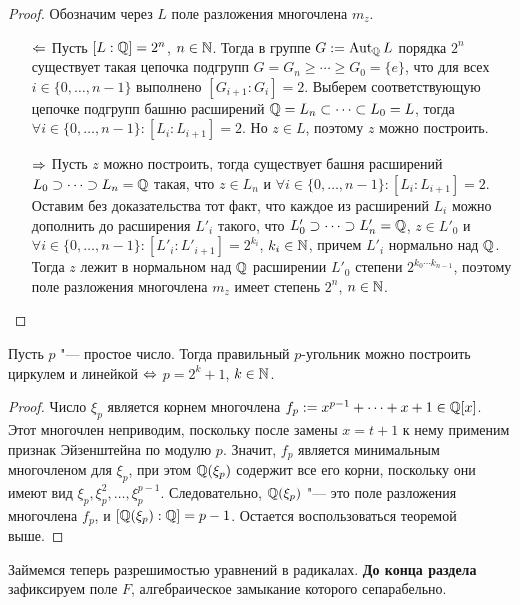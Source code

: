 \begin{proof}
	Обозначим через $L$ поле разложения многочлена $m_{z}$.
	\begin{itemize}
		\item[$\Leftarrow$] Пусть $[L : \mathbb{Q}] = 2^n$, $n \in \mathbb{N}$. Тогда в группе $G := \operatorname{Aut}_{\mathbb{Q}}{L}$ порядка $2^n$ существует такая цепочка подгрупп $G = G_n \ge \dotsb \ge G_0 = \{e\}$, что для всех $i \in \{0, \dotsc, n - 1\}$ выполнено $[G_{i+1} : G_{i}] = 2$. Выберем соответствующую цепочке подгрупп башню расширений $\mathbb{Q} = L_n \subset \dotsb \subset L_0 = L$, тогда $\forall i \in \{0, \dotsc, n-1\}: [L_i : L_{i+1}] = 2$. Но $z \in L$, поэтому $z$ можно построить.
		
		\item[$\Rightarrow$] Пусть $z$ можно построить, тогда существует башня расширений $L_0 \supset \dotsb \supset L_n = \mathbb{Q}$ такая, что $z \in L_n$ и $\forall i \in \{0, \dotsc, n-1\}: [L_{i} : L_{i + 1}] = 2$. Оставим без доказательства тот факт, что каждое из расширений $L_i$ можно дополнить до расширения ${L}'_i$ такого, что $L'_0 \supset \dotsb \supset L'_n = \mathbb{Q}$, $z \in L'_0$ и $\forall i \in \{0, \dotsc, n - 1\}: [L'_i : L'_{i + 1}] = 2^{k_i}$, $k_i \in \mathbb{N}$, причем $L'_i$ нормально над $\mathbb{Q}$. Тогда $z$ лежит в нормальном над $\mathbb{Q}$ расширении $L'_0$ степени $2^{k_0\dotsm k_{n-1}}$, поэтому поле разложения многочлена $m_z$ имеет степень $2^n$, $n \in \mathbb{N}$.\qedhere
	\end{itemize}
\end{proof}

\begin{corollary}
	Пусть $p$ "--- простое число. Тогда правильный $p$-угольник можно построить циркулем и линейкой $\Leftrightarrow$ $p = 2^k + 1$, $k \in \mathbb{N}$.
\end{corollary}

\begin{proof}
	Число $\xi_p$ является корнем многочлена $f_p := x^{p - 1} + \dotsb + x + 1 \in \mathbb{Q}[x]$. Этот многочлен неприводим, поскольку после замены $x = t + 1$ к нему применим признак Эйзенштейна по модулю $p$. Значит, $f_p$ является минимальным многочленом для $\xi_p$, при этом $\mathbb{Q}(\xi_p)$ содержит все его корни, поскольку они имеют вид $\xi_p, \xi_p^2, \dotsc, \xi_p^{p - 1}$. Следовательно, $\mathbb{Q}(\xi_p)$ "--- это поле разложения многочлена $f_p$, и $[\mathbb{Q}(\xi_p) : \mathbb{Q}] = p - 1$. Остается воспользоваться теоремой выше.
\end{proof}

Займемся теперь разрешимостью уравнений в радикалах. \textbf{До конца раздела} зафиксируем поле $F$, алгебраическое замыкание которого сепарабельно.

